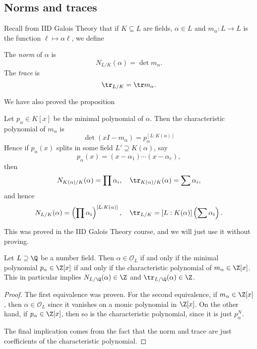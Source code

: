 \documentclass[a4paper]{article}
\begin{document}
\subsection{Norms and traces}
Recall from IID Galois Theory that if $K \subseteq L$ are fields, $\alpha \in L$ and $m_\alpha: L \to L$ is the function $\ell \mapsto \alpha \ell$, we define
\begin{defi}
  The \emph{norm} of $\alpha$ is
  \[
    N_{L/K}(\alpha) = \det m_\alpha.
  \]
  The \emph{trace} is
  \[
    \tr_{L/K} = \tr m_\alpha.
  \]
\end{defi}

We have also proved the proposition
\begin{prop}
  Let $p_\alpha \in K[x]$ be the minimal polynomial of $\alpha$. Then the characteristic polynomial of $m_\alpha$ is
  \[
    \det(xI - m_\alpha) = p_\alpha^{[L:K(\alpha)]}
  \]
  Hence if $p_\alpha(x)$ splits in some field $L'\supseteq K(\alpha)$, say
  \[
    p_\alpha(x) = (x - \alpha_1) \cdots (x - \alpha_r),
  \]
  then
  \[
    N_{K(\alpha)/K}(\alpha) = \prod \alpha_i,\quad \tr_{K(\alpha)/K}(\alpha) = \sum \alpha_i,
  \]
  and hence
  \[
    N_{L/K}(\alpha) = \left(\prod \alpha_i\right)^{[L:K(\alpha)]},\quad \tr_{L/K} = [L:K(\alpha)] \left(\sum \alpha_i\right).
  \]
\end{prop}
This was proved in the IID Galois Theory course, and we will just use it without proving.

\begin{prop}
  Let $L \supseteq \Q$ be a number field. Then $\alpha \in \mathcal{O}_L$ if and only if the minimal polynomial $p_\alpha \in \Z[x]$ if and only if the characteristic polynomial of $m_\alpha \in \Z[x]$. This in particular implies $N_{L/\Q}(\alpha) \in \Z$ and $\tr_{L/\Q}(\alpha) \in \Z$.
\end{prop}

\begin{proof}
  The first equivalence was proven. For the second equivalence, if $m_\alpha \in \Z[x]$, then $\alpha \in \mathcal{O}_L$ since it vanishes on a monic polynomial in $\Z[x]$. On the other hand, if $p_\alpha \in \Z[x]$, then so is the characteristic polynomial, since it is just $p_\alpha^N$.

  The final implication comes from the fact that the norm and trace are just coefficients of the characteristic polynomial.
\end{proof}
\end{document}
